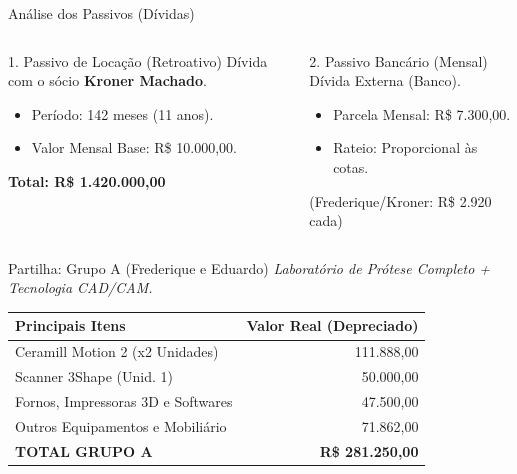 \documentclass[10pt, aspectratio=169, squeeze]{beamer}
\newcommand{\reais}[1]{R\$ #1}
\begin{document}
\begin{frame}{Análise dos Passivos (Dívidas)}
    \begin{columns}[T]
            \begin{alertblock}{1. Passivo de Locação (Retroativo)}
                Dívida com o sócio \textbf{Kroner Machado}.
                \begin{itemize}
                    \item Período: 142 meses (11 anos).
                    \item Valor Mensal Base: \reais{10.000,00}.
                \end{itemize}
                \vspace{0.2cm}
                \centering \textbf{Total: \reais{1.420.000,00}}
            \end{alertblock}

            \begin{block}{2. Passivo Bancário (Mensal)}
                Dívida Externa (Banco).
                \begin{itemize}
                    \item Parcela Mensal: \reais{7.300,00}.
                    \item Rateio: Proporcional às cotas.
                \end{itemize}
                \vspace{0.2cm}
                \centering \small (Frederique/Kroner: \reais{2.920} cada)
            \end{block}
    \end{columns}
\end{frame}

\begin{frame}{Partilha: Grupo A (Frederique e Eduardo)}
    \textit{Laboratório de Prótese Completo + Tecnologia CAD/CAM.}
    
    \begin{table}
        \centering
        \small
        \begin{tabularx}{\textwidth}{X r}
            \toprule
            \textbf{Principais Itens} & \textbf{Valor Real (Depreciado)} \\
            \midrule
            Ceramill Motion 2 (x2 Unidades) & 111.888,00 \\
            Scanner 3Shape (Unid. 1) & 50.000,00 \\
            Fornos, Impressoras 3D e Softwares & 47.500,00 \\
            Outros Equipamentos e Mobiliário & 71.862,00 \\
            \midrule
            \rowcolor{primaryColor!10} \textbf{TOTAL GRUPO A} & \textbf{\reais{281.250,00}} \\
            \bottomrule
        \end{tabularx}
    \end{table}
\end{frame}
\end{document}
